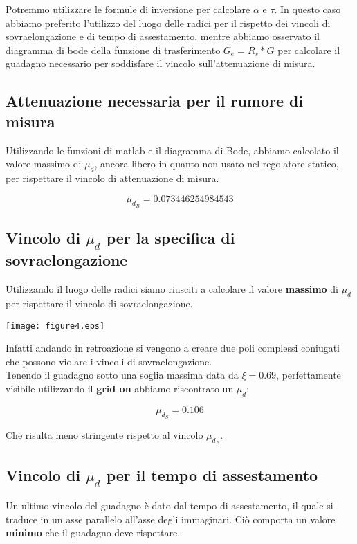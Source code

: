 \documentclass{article}
\begin{document}
Potremmo utilizzare le formule di inversione per calcolare $\alpha$ e $\tau$. In questo caso abbiamo preferito l'utilizzo del luogo delle radici per il rispetto dei vincoli di sovraelongazione e di tempo di assestamento, mentre abbiamo osservato il diagramma di bode della funzione di trasferimento $G_e = R_s * G$ per calcolare il guadagno necessario per soddisfare il vincolo sull'attenuazione di misura.

\subsection{Attenuazione necessaria per il rumore di misura}

Utilizzando le funzioni di matlab e il diagramma di Bode, abbiamo calcolato il valore massimo di $\mu_d$, ancora libero in quanto non usato nel regolatore statico, per rispettare il vincolo di attenuazione di misura.

$$
    \mu_{d_B}=0.073446254984543
$$

\subsection{Vincolo di $\mu_d$ per la specifica di sovraelongazione}

Utilizzando il luogo delle radici siamo riusciti a calcolare il valore \textbf{massimo} di $\mu_d$ per rispettare il vincolo di sovraelongazione.

\begin{center}
    \texttt{[image: figure4.eps]}
\end{center}
Infatti andando in retroazione si vengono a creare due poli complessi coniugati che possono violare i vincoli di sovraelongazione.\\
Tenendo il guadagno sotto una soglia massima data da $\xi=0.69$, perfettamente visibile utilizzando il \textbf{grid on} abbiamo riscontrato un $\mu_d$:

$$
    \mu_{d_S} = 0.106
$$

Che risulta meno stringente rispetto al vincolo $\mu_{d_B}$.

\subsection{Vincolo di $\mu_d$ per il tempo di assestamento}

Un ultimo vincolo del guadagno è dato dal tempo di assestamento, il quale si traduce in un asse parallelo all'asse degli immaginari. Ciò comporta un valore \textbf{minimo} che il guadagno deve rispettare.\\
\end{document}
